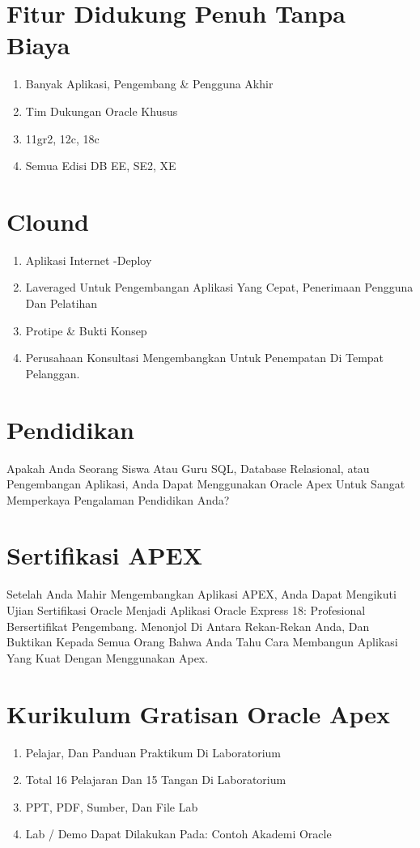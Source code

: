 \documentclass{article}
\begin{document}
\section{Fitur Didukung Penuh Tanpa Biaya}
\begin{enumerate}
    \item 	Banyak Aplikasi, Pengembang & Pengguna Akhir
\item	Tim Dukungan Oracle Khusus
\item	11gr2, 12c, 18c
\item	Semua Edisi DB EE, SE2, XE

\end{enumerate}
\section{Clound}
\begin{enumerate}
    \item 	Aplikasi Internet -Deploy
\item	Laveraged Untuk Pengembangan Aplikasi Yang Cepat, Penerimaan Pengguna Dan Pelatihan
\item	Protipe & Bukti Konsep
\item	Perusahaan Konsultasi Mengembangkan Untuk Penempatan Di Tempat Pelanggan.


\end{enumerate}
\section{Pendidikan}
 \hspace{} Apakah Anda Seorang Siswa Atau Guru SQL, Database Relasional, atau Pengembangan Aplikasi, Anda Dapat Menggunakan Oracle Apex Untuk Sangat Memperkaya Pengalaman Pendidikan Anda?

\section{Sertifikasi APEX}
\hspace{}Setelah Anda Mahir Mengembangkan Aplikasi APEX, Anda Dapat Mengikuti Ujian Sertifikasi Oracle Menjadi Aplikasi Oracle Express 18: Profesional Bersertifikat Pengembang.
Menonjol Di Antara Rekan-Rekan Anda, Dan Buktikan Kepada Semua Orang Bahwa Anda Tahu Cara Membangun Aplikasi Yang Kuat Dengan Menggunakan Apex.
\section{Kurikulum Gratisan Oracle Apex}
\begin{enumerate}
    \item 	Pelajar, Dan Panduan Praktikum Di Laboratorium
\item	Total 16 Pelajaran Dan 15 Tangan Di Laboratorium
\item	PPT, PDF, Sumber, Dan File Lab
\item	Lab / Demo Dapat Dilakukan Pada: Contoh Akademi Oracle

\end{enumerate}
\end{document}
